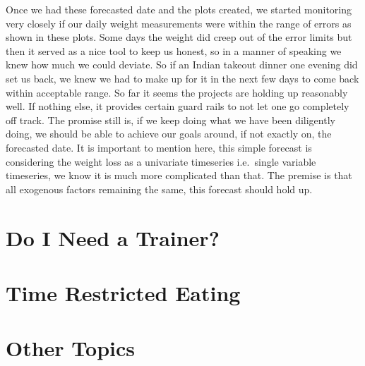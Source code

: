 \documentclass[oneside]{book}
\begin{document}
Once we had these forecasted date and the plots created, we started
monitoring very closely if our daily weight measurements were within the
range of errors as shown in these plots. Some days the weight did creep
out of the error limits but then it served as a nice tool to keep us
honest, so in a manner of speaking we knew how much we could deviate. So
if an Indian takeout dinner one evening did set us back, we knew we had
to make up for it in the next few days to come back within acceptable
range. So far it seems the projects are holding up reasonably well. If
nothing else, it provides certain guard rails to not let one go
completely off track. The promise still is, if we keep doing what we
have been diligently doing, we should be able to achieve our goals
around, if not exactly on, the forecasted date. It is important to
mention here, this simple forecast is considering the weight loss as a
univariate timeseries i.e.~single variable timeseries, we know it is
much more complicated than that. The premise is that all exogenous
factors remaining the same, this forecast should hold up.

\hypertarget{htmlwidget-1d91bf123804b10073f4}{}

\hypertarget{htmlwidget-a34476f2f82484e0b26e}{}

\chapter{Do I Need a Trainer?}\label{do-i-need-a-trainer}

\chapter{Time Restricted Eating}\label{time-restricted-eating}

\chapter{Other Topics}\label{other-topics}
\end{document}
